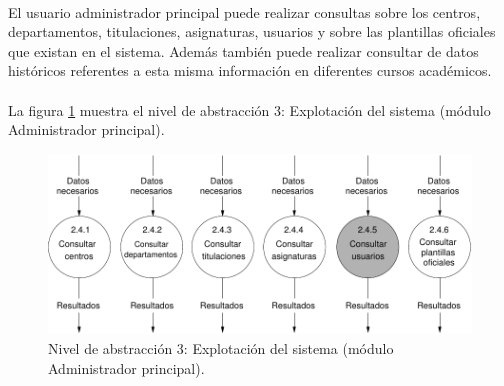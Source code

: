 \paragraph{}El usuario administrador principal puede realizar consultas sobre
los centros, departamentos, titulaciones, asignaturas, usuarios y sobre
las plantillas oficiales que existan en el sistema. Además también puede
realizar consultar de datos históricos referentes a esta misma información en
diferentes cursos académicos.

\paragraph{}La figura \ref{diagramaNivel3-ExplotacionSistema-adminPrincipal}
muestra el nivel de abstracción 3: Explotación del sistema (módulo Administrador
principal).

  \begin{figure}[!ht]
    \begin{center}
      \includegraphics[]{08.Analisis_Funcional/8.2.DFDs/Niveles/Nivel3/AdministradorPrincipal/ExplotacionSistema/Diagramas/nivel3-ExplotacionSistema.pdf}
      \caption{Nivel de abstracción 3: Explotación del sistema (módulo
      Administrador principal).}
      \label{diagramaNivel3-ExplotacionSistema-adminPrincipal}
    \end{center}
  \end{figure}